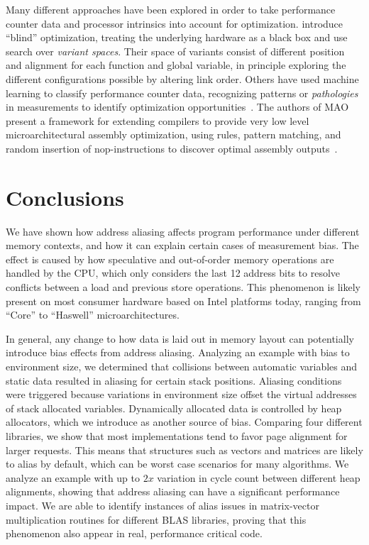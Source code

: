 \documentclass{acm_proc_article-sp}
\begin{document}
Many different approaches have been explored in order to take performance counter data and processor intrinsics into account for optimization.
 introduce ``blind'' optimization, treating the underlying hardware as a black box and use search over \emph{variant spaces}.
Their space of variants consist of different position and alignment for each function and global variable, in principle exploring the different configurations possible by altering link order.
Others have used machine learning to classify performance counter data, recognizing patterns or \emph{pathologies} in measurements to identify optimization opportunities~\cite{Yoo:ADD}.
The authors of MAO present a framework for extending compilers to provide very low level microarchitectural assembly optimization, using rules, pattern matching, and random insertion of nop-instructions to discover optimal assembly outputs~\cite{Hundt:2011:MAO}.


\section{Conclusions}
\label{sec:conclusions}
We have shown how address aliasing affects program performance under different memory contexts, and how it can explain certain cases of measurement bias.
The effect is caused by how speculative and out-of-order memory operations are handled by the CPU, which only considers the last 12 address bits to resolve conflicts between a load and previous store operations.
This phenomenon is likely present on most consumer hardware based on Intel platforms today, ranging from ``Core'' to ``Haswell'' microarchitectures.

In general, any change to how data is laid out in memory layout can potentially introduce bias effects from address aliasing.
Analyzing an example with bias to environment size, we determined that collisions between automatic variables and static data resulted in aliasing for certain stack positions.
Aliasing conditions were triggered because variations in environment size offset the virtual addresses of stack allocated variables.
Dynamically allocated data is controlled by heap allocators, which we introduce as another source of bias.
Comparing four different libraries, we show that most implementations tend to favor page alignment for larger requests.
This means that structures such as vectors and matrices are likely to alias by default, which can be worst case scenarios for many algorithms.
We analyze an example with up to $2x$ variation in cycle count between different heap alignments, showing that address aliasing can have a significant performance impact.
We are able to identify instances of alias issues in matrix-vector multiplication routines for different BLAS libraries, proving that this phenomenon also appear in real, performance critical code.
\end{document}
